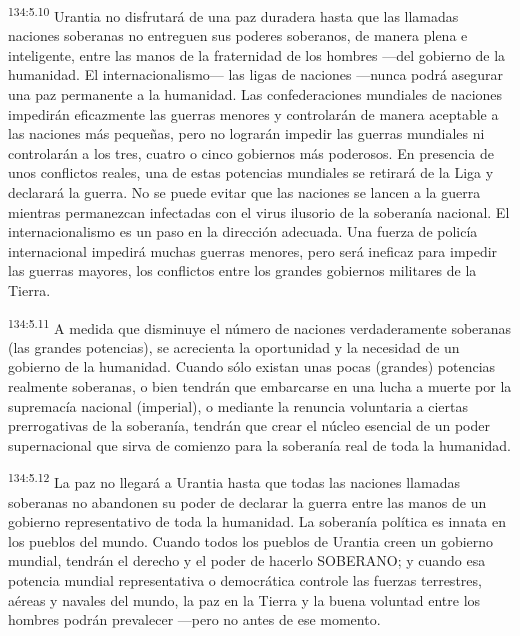 \par 
\textsuperscript{134:5.10} Urantia no disfrutará de una paz duradera hasta que las llamadas naciones soberanas no entreguen sus poderes soberanos, de manera plena e inteligente, entre las manos de la fraternidad de los hombres ---del gobierno de la humanidad. El internacionalismo--- las ligas de naciones ---nunca podrá asegurar una paz permanente a la humanidad. Las confederaciones mundiales de naciones impedirán eficazmente las guerras menores y controlarán de manera aceptable a las naciones más pequeñas, pero no lograrán impedir las guerras mundiales ni controlarán a los tres, cuatro o cinco gobiernos más poderosos. En presencia de unos conflictos reales, una de estas potencias mundiales se retirará de la Liga y declarará la guerra. No se puede evitar que las naciones se lancen a la guerra mientras permanezcan infectadas con el virus ilusorio de la soberanía nacional. El internacionalismo es un paso en la dirección adecuada. Una fuerza de policía internacional impedirá muchas guerras menores, pero será ineficaz para impedir las guerras mayores, los conflictos entre los grandes gobiernos militares de la Tierra.

\par 
\textsuperscript{134:5.11} A medida que disminuye el número de naciones verdaderamente soberanas (las grandes potencias), se acrecienta la oportunidad y la necesidad de un gobierno de la humanidad. Cuando sólo existan unas pocas (grandes) potencias realmente soberanas, o bien tendrán que embarcarse en una lucha a muerte por la supremacía nacional (imperial), o mediante la renuncia voluntaria a ciertas prerrogativas de la soberanía, tendrán que crear el núcleo esencial de un poder supernacional que sirva de comienzo para la soberanía real de toda la humanidad.

\par 
\textsuperscript{134:5.12} La paz no llegará a Urantia hasta que todas las naciones llamadas soberanas no abandonen su poder de declarar la guerra entre las manos de un gobierno representativo de toda la humanidad. La soberanía política es innata en los pueblos del mundo. Cuando todos los pueblos de Urantia creen un gobierno mundial, tendrán el derecho y el poder de hacerlo SOBERANO; y cuando esa potencia mundial representativa o democrática controle las fuerzas terrestres, aéreas y navales del mundo, la paz en la Tierra y la buena voluntad entre los hombres podrán prevalecer ---pero no antes de ese momento.

